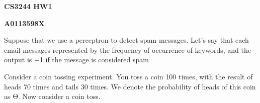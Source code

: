 \documentclass[11pt,a4paper,answers]{exam}
\providecommand{\nline}{\vspace*{.5cm}}
\begin{document}
\begin{center}
{\bf CS3244 HW1}

{\bf A0113598X}
\end{center}

\nline

\begin{questions}
	\question
	Suppose that we use a perceptron to detect spam messages. Let's say that each email messages represented by the frequency of occurrence of keywords, and the output is +1 if the message is considered spam

	\question
	Consider a coin tossing experiment. You toss a coin 100 times, with the result of heads 70 times and tails 30 times. We denote the probability of heads of this coin as Θ. Now consider a coin toss.
	\begin{parts}

\end{parts}
\end{questions}
\end{document}
